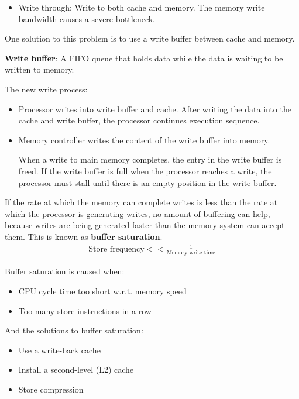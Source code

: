 \documentclass[10pt,a4paper]{article}
\begin{document}
\begin{itemize}
    \item Write through: Write to both cache and memory. The memory write bandwidth causes a severe bottleneck.
\end{itemize}

One solution to this problem is to use a write buffer between cache and memory.

\begin{tcolorbox}[breakable,colback=white]
\textbf{Write buffer}: A FIFO queue that holds data while the data is waiting to be written to memory.
\end{tcolorbox}

The new write process:
\begin{itemize}
    \item Processor writes into write buffer and cache. After writing the data into the 
    cache and write buffer, the processor continues execution sequence.
    \item Memory controller writes the content of the write buffer into memory.
    
    When a write to main memory completes, the entry in the write buffer is freed. If the write buffer 
    is full when the processor reaches a write, the processor must stall until there is an empty
    position in the write buffer.
\end{itemize}

If the rate at which the memory can complete writes is less than the rate at which the processor is generating writes, no amount of buffering can help, because writes are being generated faster than the 
memory system can accept them. This is known as \textbf{buffer saturation}.
\begin{align*}
    \text{Store frequency} << \frac{1}{\text{Memory write time}}
\end{align*}

Buffer saturation is caused when:
\begin{itemize}
    \item CPU cycle time too short w.r.t. memory speed
    \item Too many store instructions in a row
\end{itemize}

And the solutions to buffer saturation:
\begin{itemize}
    \item Use a write-back cache
    \item Install a second-level (L2) cache
    \item Store compression
\end{itemize}
\end{document}
